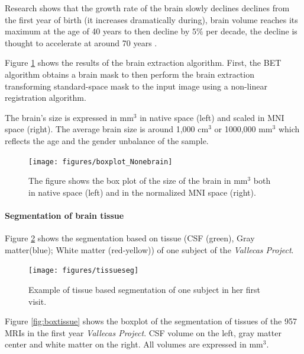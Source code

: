 \documentclass[11pt]{article}
\theoremstyle{definition}
\theoremstyle{remark}
\begin{document}
Research shows that the growth rate of the brain slowly declines declines from the first year of birth (it increases dramatically during), brain volume reaches its maximum at the age of 40 years to then decline by $5\%$ per decade, the decline is thought to accelerate at around 70 years \cite{peters2006ageing}.

Figure \ref{fig:boxbet} shows the results of the brain extraction algorithm. First, the BET algorithm obtains a brain mask to then perform the brain extraction transforming standard-space mask to the input image using a non-linear registration algorithm.

The brain's size is expressed in mm${^3}$ in native space (left) and scaled in MNI space (right). The average brain size is around 1,000 cm${^3}$ or 1000,000 mm${^3}$ which reflects the age and the gender unbalance of the sample.

\begin{figure}[H]
        \centering
        \texttt{[image: figures/boxplot\_Nonebrain]}
        \caption{The figure shows the box plot of the size of the brain in mm${^3}$ both in native space (left) and in the normalized MNI space (right).} 
        \label{fig:boxbet}
\end{figure}

\paragraph*{Segmentation of brain tissue}
Figure \ref{fig:tissueseg} shows the segmentation based on tissue (CSF (green), Gray matter(blue); White matter (red-yellow)) of one subject of the \emph{Vallecas Project}.

\begin{figure}[H]
        \centering
        \texttt{[image: figures/tissueseg]}
        \caption{Example of tissue based segmentation of one subject in her first visit. } 
        \label{fig:tissueseg}
\end{figure}

Figure \ref{fig:boxtissue} shows the boxplot of the segmentation of tissues of the 957 MRIs in the first year \emph{Vallecas Project}. CSF volume on the left, gray matter center and white matter on the right. All volumes are expressed in mm${^3}$.
\end{document}
